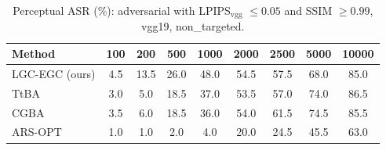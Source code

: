 \begin{table}[t]
\centering\footnotesize
\caption{Perceptual ASR (\%): adversarial with LPIPS$_{\mathrm{vgg}}$ $\le 0.05$ and SSIM $\ge 0.99$, vgg19, non\_targeted.}
\begin{tabular}{lcccccccc}
\toprule
Method & 100 & 200 & 500 & 1000 & 2000 & 2500 & 5000 & 10000 \\
\midrule
LGC-EGC (ours) & 4.5 & 13.5 & 26.0 & 48.0 & 54.5 & 57.5 & 68.0 & 85.0 \\
TtBA & 3.0 & 5.0 & 18.5 & 37.0 & 53.5 & 57.0 & 74.0 & 86.5 \\
CGBA & 3.5 & 6.0 & 18.5 & 36.0 & 54.0 & 61.5 & 74.5 & 85.5 \\
ARS-OPT & 1.0 & 1.0 & 2.0 & 4.0 & 20.0 & 24.5 & 45.5 & 63.0 \\
\bottomrule
\end{tabular}
\end{table}

